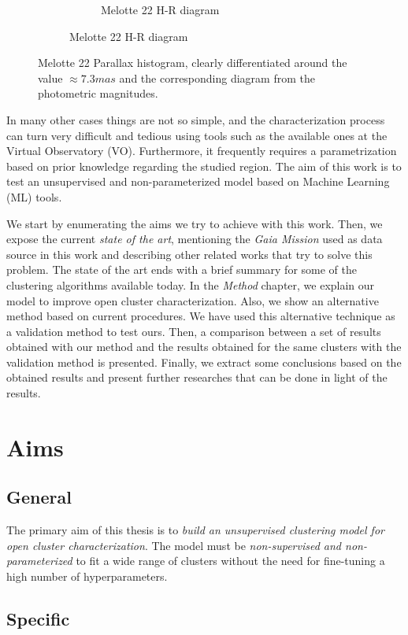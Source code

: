 \documentclass[11pt, a4paper, english]{book}
\begin{document}
\begin{figure}[htbp]
\begin{subfigure}{0.9\textwidth}
\begin{subfigure}[t]{0.45\textwidth}
      \caption{Melotte 22 H-R diagram}
    \end{subfigure}
  \end{subfigure}
  \caption{Melotte 22 Parallax histogram, clearly differentiated around the value $\approx 7.3mas$
           and the corresponding diagram from the photometric magnitudes.}
  \label{fig:melotte_22_pm_parallax}
\end{figure}

In many other cases things are not so simple,
and the characterization process can turn very difficult and tedious using tools such as the available ones at the Virtual Observatory (VO).
Furthermore, it frequently requires a parametrization based on prior knowledge regarding the studied region.
The aim of this work is to test an unsupervised and non-parameterized model based on Machine Learning (ML) tools.

We start by enumerating the aims we try to achieve with this work.
Then, we expose the current \emph{state of the art}, mentioning the \emph{Gaia Mission} used as data source in this work and
describing other related works that try to solve this problem.
The state of the art ends with a brief summary for some of the clustering algorithms available today.
In the \emph{Method} chapter, we explain our model to improve open cluster characterization.
Also, we show an alternative method based on current procedures.
We have used this alternative technique as a validation method to test ours.
Then, a comparison between a set of results obtained with our method and the results obtained
for the same clusters with the validation method is presented.
Finally, we extract some conclusions based on the obtained results and present
further researches that can be done in light of the results.

\chapter{Aims}

\section{General}

The primary aim of this thesis is to \emph{build an unsupervised clustering model for open cluster characterization}.
The model must be \emph{non-supervised and non-parameterized} to fit a wide range of clusters without
the need for fine-tuning a high number of hyperparameters.

\section{Specific}
\end{document}
